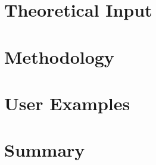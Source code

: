 \section{Theoretical Input}
\label{sec:theory}

%


\section{Methodology}
\label{sec:method}

\section{User Examples}
\label{sec:examples}


\section{Summary}
\label{sec:outlook}





%
%

